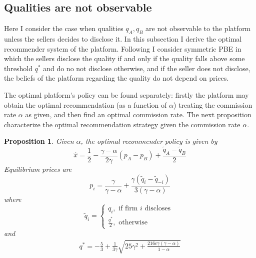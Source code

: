 \documentclass[a4paper]{article}
\newtheorem{proposition}[theorem]{Proposition}
\begin{document}
	\subsection{Qualities are not observable}
	Here I consider the case when qualities $q_A, q_B$ are not observable to the platform unless the sellers decides to disclose it. In this subsection I derive the optimal recommender system of the platform. Following \cite{levin2009quality} I consider symmetric PBE in which the sellers disclose the quality if and only if the quality falls above some threshold $q^*$ and do no not disclose otherwise, and if the seller does not disclose, the beliefs of the platform regarding the quality do not depend on prices.  
	
	
	
	The optimal platform's policy can be found separately: firstly the platform may obtain the optimal recommendation (as a function of $\alpha$) treating the commission rate $\alpha$ as given, and then find an optimal commission rate. The next proposition characterize the optimal recommendation strategy given the commission rate $\alpha$.
	\begin{proposition}\label{precise}
		Given $\alpha$, the optimal recommender policy is given by $$\hat{x} = \frac{1}{2} - \frac{\gamma-\alpha}{2 \gamma}(p_A - p_B) + \frac{\tilde{q}_A - \tilde{q}_B}{2}$$
		Equilibrium prices are $$p_i = \frac{\gamma}{\gamma - \alpha} + \frac{\gamma(\tilde{q}_{i} -\tilde{q}_{-i})}{3(\gamma-\alpha)}$$ where $$\tilde{q}_i = \begin{cases}
		q_i, \text{ if firm }i\text{ discloses }\\
		\frac{q^*}{2}, \text{ otherwise}
		\end{cases}$$
		and
		\begin{align}\label{threshold}
		q^* = -\frac{5}{3} + \frac{1}{3 \gamma} \sqrt{25 \gamma^2 + \frac{216 c \gamma (\gamma - \alpha)}{1 - \alpha}}
		\end{align}
	\end{proposition} 
\end{document}
